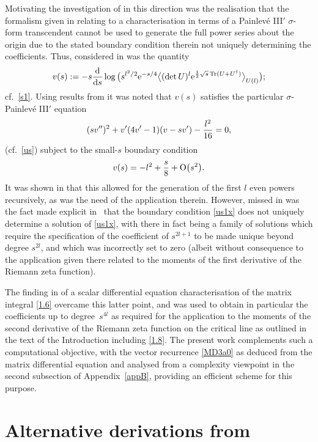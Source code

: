 \documentclass[pdftex]{sigma}
\numberwithin{equation}{section}
\theoremstyle{definition}
\begin{document}
Motivating the investigation of \cite{KW24b} in this direction was the realisation that the formalism given in \cite{FW06} relating to a characterisation in terms of a Painlev\'e III$'$ $\sigma$-form transcendent cannot be used to generate the full power series about the origin due to the stated boundary condition therein not uniquely determining the coefficients.
Thus,
considered in \cite{FW06} was the quantity
\[%
 v(s) := - s {{\rm d} \over {\rm d}s} \log \big ( s^{l^2/2}
 {\rm e}^{-s/4} \big \langle
 (\det U)^l
 {\rm e}^{{1 \over 2} \sqrt{s} \operatorname{Tr}(U + U^\dagger)} \big \rangle_{U(l)} \big );
 \]
 cf.~\eqref{s1}. Using results from \cite{FW02} it was noted that $v(s)$ satisfies the particular $\sigma$-Painlev\'e III$'$ equation
 \[%
(sv'')^2 + v' (4 v' - 1)(v - sv') - {l^2 \over 16} = 0,
\]
(cf.~\eqref{us})
subject to the small-$s$ boundary condition
\begin{equation}\label{us1x}
v(s) = - l^2 + {s \over 8} + {\rm O}\bigl(s^{2}\bigr).
\end{equation}
It was shown in \cite{FW06} that this allowed for the generation of the first $l$ even powers recursively, as was the need of the application therein. However, missed in \cite{FW06} was the fact made explicit in~\cite{KW24b} that the boundary condition \eqref{us1x} does not uniquely determine a solution of \eqref{us1x}, with there in fact being a family of solutions which require the specification of the coefficient of $s^{2l+1}$ to be made unique beyond degree $s^{2l}$, and which was incorrectly set to zero {(albeit without consequence to the application given there related to the moments of the first derivative of the Riemann zeta function)}.

The finding in \cite{KW24b} of a scalar differential equation characterisation of
the matrix integral \eqref{1.6} overcame this latter point, and was used to obtain in particular the coefficients up to degree~$s^{4l}$ as required for the application to the moments of the second derivative of the Riemann zeta function on the critical line as outlined in the text of the Introduction including \eqref{1.8}. {The present work complements such a computational objective, with the vector recurrence \eqref{MD3a0} as deduced from the matrix differential equation and analysed from a complexity viewpoint in the second subsection of Appendix~\ref{appB}, providing an efficient scheme for this purpose}.

\appendix

\section[Alternative derivations from Keating and Wei (2024)]{Alternative derivations from \cite{KW24b}}\label{appendixA}
\end{document}
